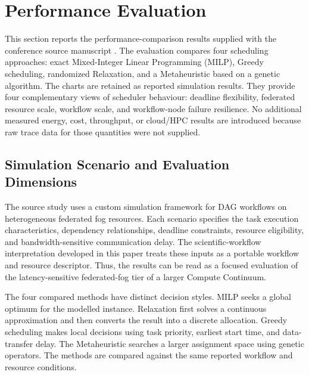 \section{Performance Evaluation}
\label{performance_analysis}

This section reports the performance-comparison results supplied with the conference source manuscript \cite{gupta2025efficient}. The evaluation compares four scheduling approaches: exact Mixed-Integer Linear Programming (MILP), Greedy scheduling, randomized Relaxation, and a Metaheuristic based on a genetic algorithm. The charts are retained as reported simulation results. They provide four complementary views of scheduler behaviour: deadline flexibility, federated resource scale, workflow scale, and workflow-node failure resilience. No additional measured energy, cost, throughput, or cloud/HPC results are introduced because raw trace data for those quantities were not supplied.

\subsection{Simulation Scenario and Evaluation Dimensions}

The source study uses a custom simulation framework for DAG workflows on heterogeneous federated fog resources. Each scenario specifies the task execution characteristics, dependency relationships, deadline constraints, resource eligibility, and bandwidth-sensitive communication delay. The scientific-workflow interpretation developed in this paper treats these inputs as a portable workflow and resource descriptor. Thus, the results can be read as a focused evaluation of the latency-sensitive federated-fog tier of a larger Compute Continuum.

The four compared methods have distinct decision styles. MILP seeks a global optimum for the modelled instance. Relaxation first solves a continuous approximation and then converts the result into a discrete allocation. Greedy scheduling makes local decisions using task priority, earliest start time, and data-transfer delay. The Metaheuristic searches a larger assignment space using genetic operators. The methods are compared against the same reported workflow and resource conditions.

